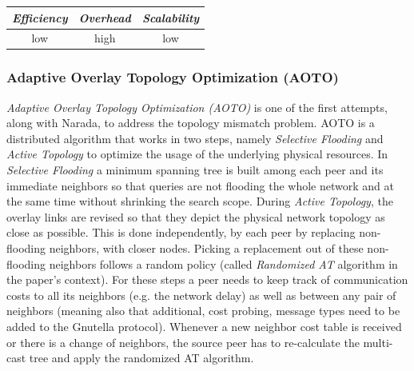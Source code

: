 \begin{center}
\begin{tabular}{ccc}
\emph{Efficiency} & \emph{Overhead} & \emph{Scalability} \\
\hline
%
low &
high &
%
low
\end{tabular}
\end{center}

\subsubsection{Adaptive Overlay Topology Optimization (AOTO)}
\emph{Adaptive Overlay Topology Optimization (AOTO)} \cite{LZXN2003} is one
of the first attempts, along with Narada, to address the topology mismatch
problem. AOTO is a distributed algorithm that works in two steps, namely
\emph{Selective Flooding} and \emph{Active Topology} to optimize the usage of
the underlying physical resources. In \emph{Selective Flooding} a minimum
spanning tree is built among each peer and its immediate neighbors so that
queries are not flooding the whole network and at the same time without
shrinking the search scope. During \emph{Active Topology}, the overlay
links are revised so that they depict the physical network topology as close as
possible. This is done independently, by each peer by replacing non-flooding
neighbors, with closer nodes. Picking a replacement out of these non-flooding
neighbors follows a random policy (called \emph{Randomized AT} algorithm in the
paper's context). For these steps a peer needs to keep track of communication
costs to all its neighbors (e.g. the network delay) as well as between any
pair of neighbors (meaning also that additional, cost probing, message types
need to be added to the Gnutella protocol). Whenever a new neighbor cost table
is received or there is a change of neighbors, the source peer has to
re-calculate the multi-cast tree and apply the randomized AT algorithm.

